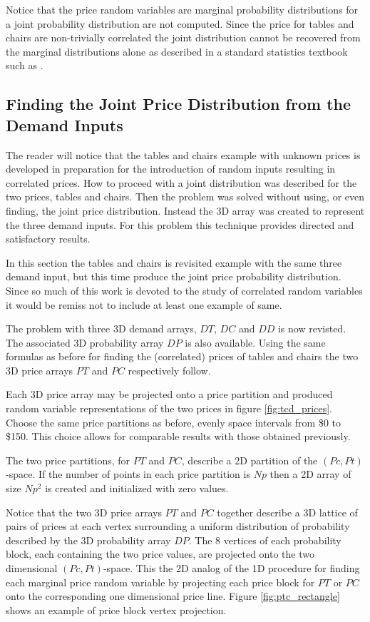 Notice that the price random variables are marginal probability distributions for a joint probability distribution are not computed. Since the price for tables and chairs are non-trivially correlated the joint distribution cannot be recovered from the marginal distributions alone as described in a standard statistics textbook such as \cite{bickel01}. 

\subsection{Finding the Joint Price Distribution from the Demand Inputs}

The reader will notice that the tables and chairs example with unknown prices is developed in preparation for the introduction of random inputs resulting in correlated prices. How to proceed with a joint distribution was described for the two prices, tables and chairs. Then the problem was solved without using, or even finding, the joint price distribution. Instead the 3D array was created to represent the three demand inputs. For this problem this technique provides directed and satisfactory results.

In this section the tables and chairs is revisited example with the same three demand input, but this time produce the joint price probability distribution. Since so much of this work is devoted to the study of correlated random variables it would be remiss not to include at least one example of same.

The problem with three 3D demand arrays, $DT$, $DC$ and  $DD$ is now revisted. The associated 3D probability array $DP$ is also available. Using the same formulas as before for finding the (correlated) prices of tables and chairs the two 3D price arrays $PT$ and $PC$ respectively follow. 

Each 3D price array may be projected onto a price partition and produced random variable representations of the two prices in figure \ref{fig:tcd_prices}. Choose the same price partitions as before, evenly space intervals from \$0 to \$150. This choice allows for comparable results with those obtained previously.

The two price partitions, for $PT$ and $PC$, describe a 2D partition of the $(Pc,Pt)$-space. If the number of points in each price partition is $Np$ then a 2D array of size $Np^2$ is created and initialized with zero values.

Notice that the two 3D price arrays $PT$ and $PC$ together describe a 3D lattice of pairs of prices at each vertex surrounding a uniform distribution of probability described by the 3D probability array $DP$. The 8 vertices of each probability block, each containing the two price values, are projected onto the two dimensional $(Pc, Pt)$-space. This the 2D analog of the 1D procedure for finding each marginal price random variable by projecting each price block for $PT$ or $PC$ onto the corresponding one dimensional price line. Figure \ref{fig:ptc_rectangle} shows an example of price block vertex projection. 

